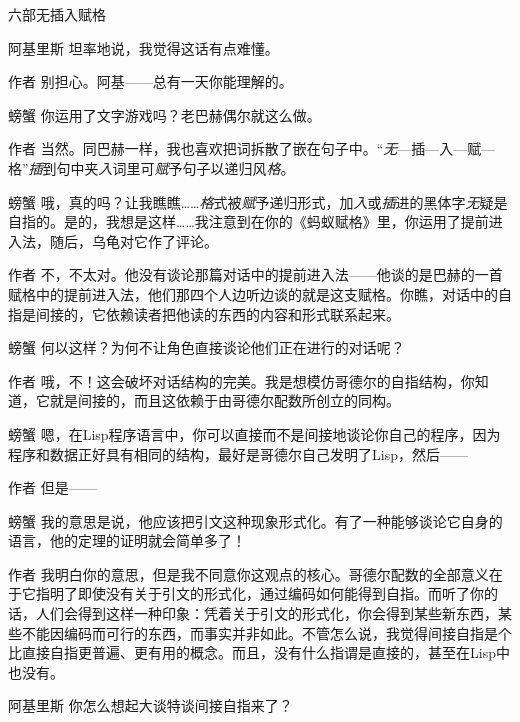 \begin{dialog}{六部无插入赋格}
\begin{dialogue}
\item[阿基里斯]坦率地说，我觉得这话有点难懂。

\item[作者]别担心。阿基——总有一天你能理解的。

\item[螃蟹]你运用了文字游戏吗？老巴赫偶尔就这么做。

\item[作者]当然。同巴赫一样，我也喜欢把词拆散了嵌在句子中。“\emph{无}—插—入—赋—格”\emph{插}到句中夹\emph{入}词里可\emph{赋}予句子以递归风\emph{格}。

\item[螃蟹]哦，真的吗？让我瞧瞧……\emph{格}式被\emph{赋}予递归形式，加\emph{入}或\emph{插}进的黑体字\emph{无}疑是自指的。是的，我想是这样……我注意到在你的《蚂蚁赋格》里，你运用了提前进入法，随后，乌龟对它作了评论。

\item[作者]不，不太对。他没有谈论那篇对话中的提前进入法——他谈的是巴赫的一首赋格中的提前进入法，他们那四个人边听边谈的就是这支赋格。你瞧，对话中的自指是间接的，它依赖读者把他读的东西的内容和形式联系起来。

\item[螃蟹]何以这样？为何不让角色直接谈论他们正在进行的对话呢？

\item[作者]哦，不！这会破坏对话结构的完美。我是想模仿哥德尔的自指结构，你知道，它就是间接的，而且这依赖于由哥德尔配数所创立的同构。

\item[螃蟹]嗯，在Lisp程序语言中，你可以直接而不是间接地谈论你自己的程序，因为程序和数据正好具有相同的结构，最好是哥德尔自己发明了Lisp，然后——

\item[作者]但是——

\item[螃蟹]我的意思是说，他应该把引文这种现象形式化。有了一种能够谈论它自身的语言，他的定理的证明就会简单多了！

\item[作者]我明白你的意思，但是我不同意你这观点的核心。哥德尔配数的全部意义在于它指明了即使没有关于引文的形式化，通过编码如何能得到自指。而听了你的话，人们会得到这样一种印象：凭着关于引文的形式化，你会得到某些新东西，某些不能因编码而可行的东西，而事实并非如此。不管怎么说，我觉得间接自指是个比直接自指更普遍、更有用的概念。而且，没有什么指谓是直接的，甚至在Lisp中也没有。

\item[阿基里斯]你怎么想起大谈特谈间接自指来了？


\end{dialogue}
\end{dialog}
